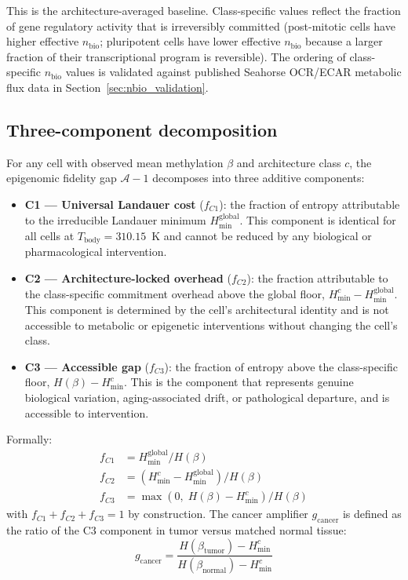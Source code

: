 \documentclass[12pt,a4paper]{article}
\newcommand{\Hmin}{H_{\min}}
\newcommand{\nbio}{n_{\mathrm{bio}}}
\newcommand{\Ascore}{\mathcal{A}}
\newcommand{\Tbody}{T_{\mathrm{body}}}
\newcommand{\gcancer}{g_{\mathrm{cancer}}}
\begin{document}
This is the architecture-averaged baseline. Class-specific values reflect
the fraction of gene regulatory activity that is irreversibly committed
(post-mitotic cells have higher effective $\nbio$; pluripotent cells have
lower effective $\nbio$ because a larger fraction of their transcriptional
program is reversible). The ordering of class-specific $\nbio$ values is
validated against published Seahorse OCR/ECAR metabolic flux data in
Section~\ref{sec:nbio_validation}.

\subsection{Three-component decomposition}
\label{sec:decomp}

For any cell with observed mean methylation $\beta$ and architecture class $c$,
the epigenomic fidelity gap $\Ascore - 1$ decomposes into three additive
components:

\begin{itemize}[leftmargin=2em,itemsep=2pt]
  \item \textbf{C1 --- Universal Landauer cost} ($f_{C1}$): the fraction of entropy
    attributable to the irreducible Landauer minimum $\Hmin^{\mathrm{global}}$.
    This component is identical for all cells at $\Tbody = 310.15$~K and cannot
    be reduced by any biological or pharmacological intervention.

  \item \textbf{C2 --- Architecture-locked overhead} ($f_{C2}$): the fraction
    attributable to the class-specific commitment overhead above the global floor,
    $\Hmin^{c} - \Hmin^{\mathrm{global}}$. This component is determined by the
    cell's architectural identity and is not accessible to metabolic or epigenetic
    interventions without changing the cell's class.

  \item \textbf{C3 --- Accessible gap} ($f_{C3}$): the fraction of entropy above
    the class-specific floor, $H(\beta) - \Hmin^{c}$. This is the component that
    represents genuine biological variation, aging-associated drift, or pathological
    departure, and is accessible to intervention.
\end{itemize}

Formally:
\begin{align}
  f_{C1} &= \Hmin^{\mathrm{global}} / H(\beta) \label{eq:c1}\\
  f_{C2} &= (\Hmin^{c} - \Hmin^{\mathrm{global}}) / H(\beta) \label{eq:c2}\\
  f_{C3} &= \max(0,\; H(\beta) - \Hmin^{c}) / H(\beta) \label{eq:c3}
\end{align}
with $f_{C1} + f_{C2} + f_{C3} = 1$ by construction. The cancer amplifier
$\gcancer$ is defined as the ratio of the C3 component in tumor versus matched
normal tissue:
\begin{equation}
  \gcancer = \frac{H(\beta_{\mathrm{tumor}}) - \Hmin^{c}}{H(\beta_{\mathrm{normal}}) - \Hmin^{c}}
  \label{eq:gcancer}
\end{equation}
\end{document}
